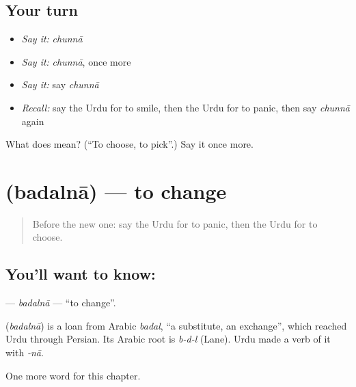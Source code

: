 \subsection*{Your turn}
\begin{itemize}
\raggedright
  \item \emph{Say it:} \emph{chunnā}
  \item \emph{Say it:} \emph{chunnā}, once more
  \item \emph{Say it:} say \emph{chunnā}
  \item \emph{Recall:} say the Urdu for to smile, then the Urdu for to panic, then say \emph{chunnā} again
\end{itemize}

\begin{tcolorbox}[breakable,colback=teal!4,colframe=teal!35!black,title={Before you move on}]
What does  mean? (\textquotedblleft{}To choose, to pick\textquotedblright{}.) Say it once more.
\end{tcolorbox}
\section[\texorpdfstring{\ur{بدلنا} (badalnā)}{بدلنا (badalnā)}]{ (badalnā) — to change}

\label{lesson:UR-C148-badalna}



\begin{quote}
Before the new one: say the Urdu for to panic, then the Urdu for to choose.
\end{quote}

\subsection*{You'll want to know: }
\textbf{} — \emph{badalnā} — \textquotedblleft{}to change\textquotedblright{}.

\begin{cousinweb}
\textbf{} (\emph{badalnā}) is a loan from Arabic \emph{badal}, \textquotedblleft{}a substitute, an exchange\textquotedblright{}, which reached Urdu through Persian. Its Arabic root is \emph{b-d-l} (Lane). Urdu made a verb of it with \emph{-nā}.
\end{cousinweb}

\begin{grammarlens}[title={What you've built}]
One more word for this chapter.
\end{grammarlens}

